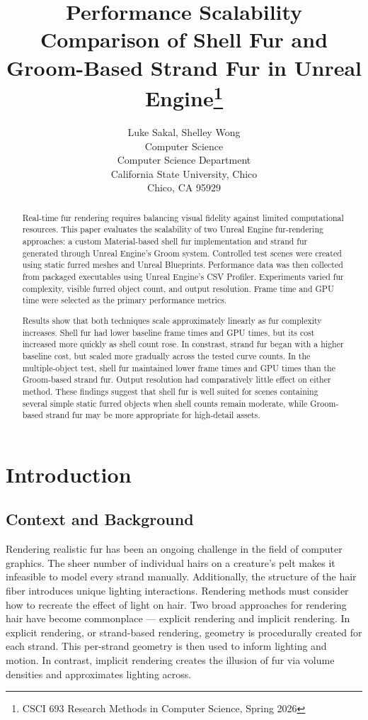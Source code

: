 \documentclass{article}
\title{Performance Scalability Comparison of Shell Fur and Groom-Based Strand Fur in Unreal Engine\footnote{CSCI 693 Research Methods in Computer Science, Spring 2026}}
\author{
  Luke Sakal\affmark[1], Shelley Wong\affmark[2]\\
  \affmark[1]Computer Science\\
  \affmark[2]Computer Science Department\\
  California State University, Chico\\
  Chico, CA 95929\\
  \email{\{lesakal,swong26\}@csuchico.edu}
}
\begin{document}
\maketitle

\begin{abstract}
Real-time fur rendering requires balancing visual fidelity against limited computational resources. This paper evaluates the scalability of two Unreal Engine fur-rendering approaches: a custom Material-based shell fur implementation and strand fur generated through Unreal Engine's Groom system. Controlled test scenes were created using static furred meshes and Unreal Blueprints. Performance data was then collected from packaged executables using Unreal Engine's CSV Profiler. Experiments varied fur complexity, visible furred object count, and output resolution. Frame time and GPU time were selected as the primary performance metrics.

Results show that both techniques scale approximately linearly as fur complexity increases. Shell fur had lower baseline frame times and GPU times, but its cost increased more quickly as shell count rose. In constrast, strand fur began with a higher baseline cost, but scaled more gradually across the tested curve counts. In the multiple-object test, shell fur maintained lower frame times and GPU times than the Groom-based strand fur. Output resolution had comparatively little effect on either method. These findings suggest that shell fur is well suited for scenes containing several simple static furred objects when shell counts remain moderate, while Groom-based strand fur may be more appropriate for high-detail assets.
\end{abstract}

\section{Introduction}

\subsection{Context and Background}

Rendering realistic fur has been an ongoing challenge in the field of computer graphics. The sheer number of individual hairs on a creature's pelt makes it infeasible to model every strand manually. Additionally, the structure of the hair fiber introduces unique lighting interactions. Rendering methods must consider how to recreate the effect of light on hair. Two broad approaches for rendering hair have become commonplace --- explicit rendering and implicit rendering\cite{andersen2016hybrid}. In explicit rendering, or strand-based rendering, geometry is procedurally created for each strand. This per-strand geometry is then used to inform lighting and motion. In contrast, implicit rendering creates the illusion of fur via volume densities and approximates lighting across.
\end{document}
